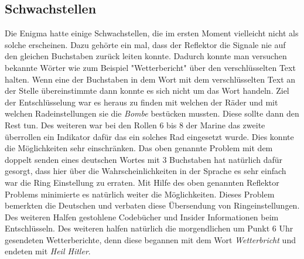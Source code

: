 \subsection{Schwachstellen}
Die Enigma hatte einige Schwachstellen, die im ersten Moment vielleicht nicht als solche erscheinen. Dazu gehörte ein mal, dass der Reflektor die Signale nie auf den gleichen Buchstaben zurück leiten konnte. Dadurch konnte man versuchen bekannte Wörter wie zum Beispiel "Wetterbericht" über den verschlüsselten Text halten. Wenn eine der Buchstaben in dem Wort mit dem verschlüsselten Text an der Stelle übereinstimmte dann konnte es sich nicht um das Wort handeln. Ziel der Entschlüsselung war es heraus zu finden mit welchen der Räder und mit welchen Radeinstellungen sie die \emph{Bombe} bestücken mussten. Diese sollte dann den Rest tun. Des weiteren war bei den Rollen 6 bis 8 der Marine das zweite überrollen ein Indikator dafür das ein solches Rad eingesetzt wurde. Dies konnte die Möglichkeiten sehr einschränken. Das oben genannte Problem mit dem doppelt senden eines deutschen Wortes mit 3 Buchstaben hat natürlich dafür gesorgt, dass hier über die Wahrscheinlichkeiten in der Sprache es sehr einfach war die Ring Einstellung zu erraten. Mit Hilfe des oben genannten Reflektor Problems minimierte es natürlich weiter die Möglichkeiten. Dieses Problem bemerkten die Deutschen und verbaten diese Übersendung von Ringeinstellungen. Des weiteren Halfen gestohlene Codebücher und Insider Informationen beim Entschlüsseln. Des weiteren halfen natürlich die morgendlichen um Punkt 6 Uhr gesendeten Wetterberichte, denn diese begannen mit dem Wort \emph{Wetterbricht} und endeten mit \emph{Heil Hitler}. \cite{enigmaflaw} \cite{enigmaproblem1}